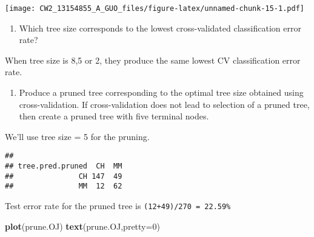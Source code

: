 \documentclass[]{article}
\newenvironment{Shaded}{\begin{snugshade}}{\end{snugshade}}
\newcommand{\KeywordTok}[1]{\textcolor[rgb]{0.13,0.29,0.53}{\textbf{#1}}}
\newcommand{\DataTypeTok}[1]{\textcolor[rgb]{0.13,0.29,0.53}{#1}}
\newcommand{\DecValTok}[1]{\textcolor[rgb]{0.00,0.00,0.81}{#1}}
\newcommand{\StringTok}[1]{\textcolor[rgb]{0.31,0.60,0.02}{#1}}
\newcommand{\OperatorTok}[1]{\textcolor[rgb]{0.81,0.36,0.00}{\textbf{#1}}}
\newcommand{\NormalTok}[1]{#1}
\providecommand{\tightlist}{%
  \setlength{\itemsep}{0pt}\setlength{\parskip}{0pt}}
\begin{document}
\begin{Shaded}
\end{Shaded}

\texttt{[image: CW2\_13154855\_A\_GUO\_files/figure-latex/unnamed-chunk-15-1.pdf]}

\begin{enumerate}
\def\labelenumi{(\alph{enumi})}
\setcounter{enumi}{7}
\tightlist
\item
  Which tree size corresponds to the lowest cross-validated
  classification error rate?
\end{enumerate}

When tree size is 8,5 or 2, they produce the same lowest CV
classification error rate.

\begin{enumerate}
\def\labelenumi{(\roman{enumi})}
\tightlist
\item
  Produce a pruned tree corresponding to the optimal tree size obtained
  using cross-validation. If cross-validation does not lead to selection
  of a pruned tree, then create a pruned tree with five terminal nodes.
\end{enumerate}

We'll use tree size = 5 for the pruning.

\begin{Shaded}
\end{Shaded}

\begin{verbatim}
##                 
## tree.pred.pruned  CH  MM
##               CH 147  49
##               MM  12  62
\end{verbatim}

Test error rate for the pruned tree is \texttt{(12+49)/270\ =\ 22.59\%}

\begin{Shaded}
\begin{Highlighting}[]
\KeywordTok{plot}\NormalTok{(prune.OJ)}
\KeywordTok{text}\NormalTok{(prune.OJ,}\DataTypeTok{pretty=}\DecValTok{0}\NormalTok{)}
\end{Highlighting}
\end{Shaded}
\end{document}

